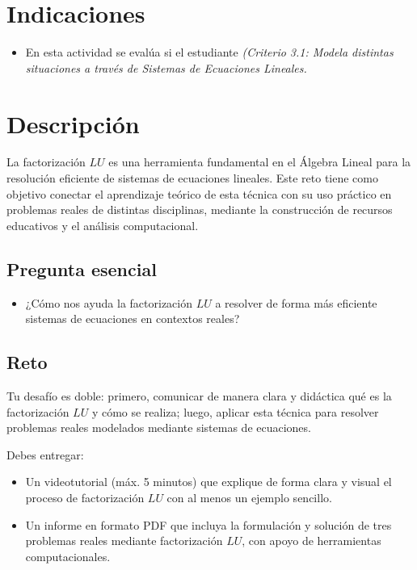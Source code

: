 \documentclass[a4,11pt]{aleph-notas}
\begin{document}
\encabezado

\section{Indicaciones}
\begin{itemize}[leftmargin=*]
\item 
    En esta actividad se evalúa si el estudiante \textit{(Criterio 3.1: Modela distintas situaciones a través de Sistemas de Ecuaciones Lineales.}
\end{itemize}


\section{Descripción}  

La factorización $LU$ es una herramienta fundamental en el Álgebra Lineal para la resolución eficiente de sistemas de ecuaciones lineales. Este reto tiene como objetivo conectar el aprendizaje teórico de esta técnica con su uso práctico en problemas reales de distintas disciplinas, mediante la construcción de recursos educativos y el análisis computacional.

\subsection*{Pregunta esencial}  
\begin{itemize}[leftmargin=*]
\item ¿Cómo nos ayuda la factorización $LU$ a resolver de forma más eficiente sistemas de ecuaciones en contextos reales?
\end{itemize}

\subsection*{Reto}  

Tu desafío es doble: primero, comunicar de manera clara y didáctica qué es la factorización $LU$ y cómo se realiza; luego, aplicar esta técnica para resolver problemas reales modelados mediante sistemas de ecuaciones.

Debes entregar:
\begin{itemize}[leftmargin=*]
\item Un videotutorial (máx. 5 minutos) que explique de forma clara y visual el proceso de factorización $LU$ con al menos un ejemplo sencillo.
\item Un informe en formato PDF que incluya la formulación y solución de tres problemas reales mediante factorización $LU$, con apoyo de herramientas computacionales.
\end{itemize}
\end{document}
